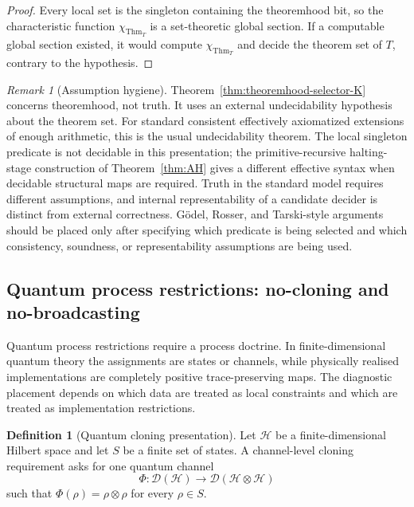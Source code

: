 \documentclass[11pt]{article}
\theoremstyle{plain}
\theoremstyle{definition}
\newtheorem{definition}[theorem]{Definition}
\theoremstyle{remark}
\newtheorem{remark}[theorem]{Remark}
\begin{document}
\begin{proof}
Every local set is the singleton containing the theoremhood bit, so the
characteristic function $\chi_{\operatorname{Thm}_T}$ is a set-theoretic global
section. If a computable global section existed, it would compute
$\chi_{\operatorname{Thm}_T}$ and decide the theorem set of $T$, contrary to the
hypothesis.
\end{proof}

\begin{remark}[Assumption hygiene]
Theorem~\ref{thm:theoremhood-selector-K} concerns theoremhood, not truth. It
uses an external undecidability hypothesis about the theorem set. For standard
consistent effectively axiomatized extensions of enough arithmetic, this is the
usual undecidability theorem. The local singleton predicate is not decidable in
this presentation; the primitive-recursive halting-stage construction of
Theorem~\ref{thm:AH} gives a different effective syntax when decidable structural
maps are required. Truth in the standard model requires different assumptions,
and internal representability of a candidate decider is distinct from external
correctness. Gödel, Rosser, and Tarski-style arguments should be placed only
after specifying which predicate is being selected and which consistency,
soundness, or representability assumptions are being used.
\end{remark}

\subsection{Quantum process restrictions: no-cloning and no-broadcasting}
\label{subsec:quantum-process-placement}

Quantum process restrictions require a process doctrine. In finite-dimensional
quantum theory the assignments are states or channels, while physically realised
implementations are completely positive trace-preserving maps. The diagnostic
placement depends on which data are treated as local constraints and which are
treated as implementation restrictions.

\begin{definition}[Quantum cloning presentation]
\label{def:quantum-cloning-presentation}
Let $\mathcal H$ be a finite-dimensional Hilbert space and let $S$ be a finite
set of states. A channel-level cloning requirement asks for one quantum channel
\[
\Phi:\mathcal D(\mathcal H)\to\mathcal D(\mathcal H\otimes\mathcal H)
\]
such that $\Phi(\rho)=\rho\otimes\rho$ for every $\rho\in S$.
\end{definition}
\end{document}
